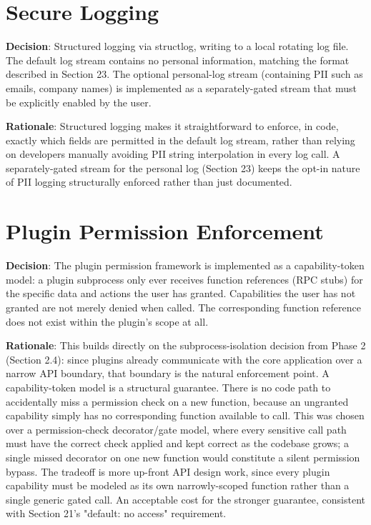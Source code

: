 \section{Secure Logging}
\textbf{Decision}: Structured logging via structlog, writing to a local rotating log file. The default log stream contains no personal information, matching the format described in Section 23. The optional personal-log stream (containing PII such as emails, company names) is implemented as a separately-gated stream that must be explicitly enabled by the user.

\textbf{Rationale}: Structured logging makes it straightforward to enforce, in code, exactly which fields are permitted in the default log stream, rather than relying on developers manually avoiding PII string interpolation in every log call. A separately-gated stream for the personal log (Section 23) keeps the opt-in nature of PII logging structurally enforced rather than just documented.
\section{Plugin Permission Enforcement}
\textbf{Decision}: The plugin permission framework is implemented as a capability-token model: a plugin subprocess only ever receives function references (RPC stubs) for the specific data and actions the user has granted. Capabilities the user has not granted are not merely denied when called. The corresponding function reference does not exist within the plugin's scope at all.

\textbf{Rationale}: This builds directly on the subprocess-isolation decision from Phase 2 (Section 2.4): since plugins already communicate with the core application over a narrow API boundary, that boundary is the natural enforcement point. A capability-token model is a structural guarantee. There is no code path to accidentally miss a permission check on a new function, because an ungranted capability simply has no corresponding function available to call. This was chosen over a permission-check decorator/gate model, where every sensitive call path must have the correct check applied and kept correct as the codebase grows; a single missed decorator on one new function would constitute a silent permission bypass. The tradeoff is more up-front API design work, since every plugin capability must be modeled as its own narrowly-scoped function rather than a single generic gated call. An acceptable cost for the stronger guarantee, consistent with Section 21's "default: no access" requirement.
